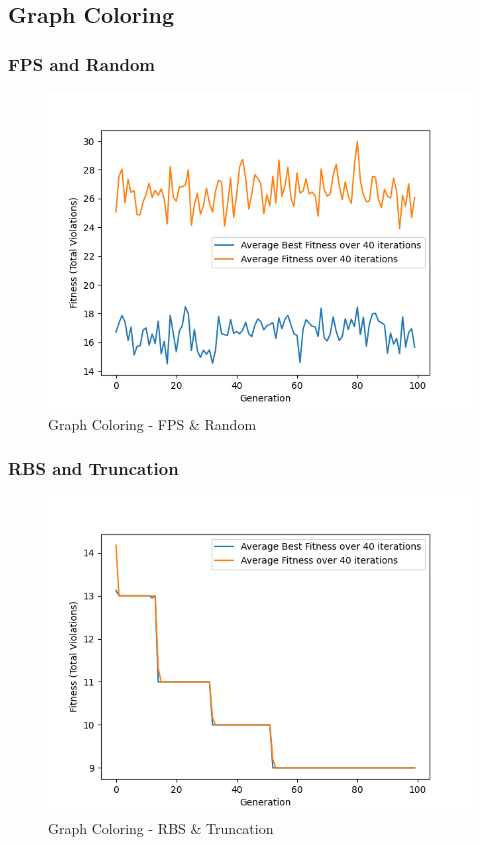 \documentclass[11pt, letterpaper]{article}
\begin{document}
\newpage

\subsection{Graph Coloring}
\subsubsection {FPS and Random}
\begin{figure}[H]
    \centering
    \includegraphics[scale = 0.6]{images/graphcoloring_fp_rd.png}
    \caption {Graph Coloring - FPS \& Random}
    \label {fig:gcFR}
\end{figure}
\subsubsection {RBS and Truncation}
\begin{figure}[h]
    \centering
    \includegraphics[scale = 0.6]{images/graphcoloring_rb_tr.png}
    \caption {Graph Coloring - RBS \& Truncation}
    \label {fig:gcBT}
\end{figure}
\end{document}
